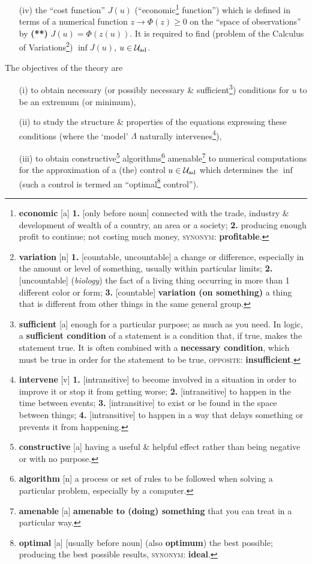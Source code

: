 \documentclass[oneside]{book}
\numberwithin{equation}{section}
\begin{document}
\begin{itemize}
	\item[(iv)] the ``cost function'' $J(u)$ (``economic\footnote{\textbf{economic} [a] \textbf{1.} [only before noun] connected with the trade, industry \& development of wealth of a country, an area or a society; \textbf{2.} producing enough profit to continue; not costing much money, \textsc{synonym}: \textbf{profitable}.} function'') which is defined in terms of a numerical function $z\to\Phi(z)\ge 0$ on the ``space of observations'' by \textbf{(**)} $J(u) = \Phi(z(u))$. It is required to find (problem of the Calculus of Variations\footnote{\textbf{variation} [n] \textbf{1.} [countable, uncountable] a change or difference, especially in the amount or level of something, usually within particular limits; \textbf{2.} [uncountable] (\textit{biology}) the fact of a living thing occurring in more than 1 different color or form; \textbf{3.} [countable] \textbf{variation (on something)} a thing that is different from other things in the same general group.}) $\inf J(u)$, $u\in\mathcal{U}_{\rm ad}$.
\end{itemize}
The objectives of the theory are
\begin{itemize}
	\item[(i)] to obtain necessary (or possibly necessary \& sufficient\footnote{\textbf{sufficient} [a] enough for a particular purpose; as much as you need. In logic, a \textbf{sufficient condition} of a statement is a condition that, if true, makes the statement true. It is often combined with a \textbf{necessary condition}, which must be true in order for the statement to be true, \textsc{opposite}: \textbf{insufficient}.}) conditions for $u$ to be an extremum (or minimum),
	\item[(ii)] to study the structure \& properties of the equations expressing these conditions (where the `model' $\Lambda$ naturally intervenes\footnote{\textbf{intervene} [v] \textbf{1.} [intransitive] to become involved in a situation in order to improve it or stop it from getting worse; \textbf{2.} [intransitive] to happen in the time between events; \textbf{3.} [intransitive] to exist or be found in the space between things; \textbf{4.} [intransitive] to happen in a way that delays something or prevents it from happening.}),
	\item[(iii)] to obtain constructive\footnote{\textbf{constructive} [a] having a useful \& helpful effect rather than being negative or with no purpose.} algorithms\footnote{\textbf{algorithm}  [n] a process or set of rules to be followed when solving a particular problem, especially by a computer.} amenable\footnote{\textbf{amenable} [a] \textbf{amenable to (doing) something} that you can treat in a particular way.} to numerical computations for the approximation of a (the) control $u\in\mathcal{U}_{\rm ad}$ which determines the $\inf$ (such a control is termed an ``optimal\footnote{\textbf{optimal} [a] [usually before noun] (also \textbf{optimum}) the best possible; producing the best possible results, \textsc{synonym}: \textbf{ideal}.} control'').
\end{itemize}
\end{document}
